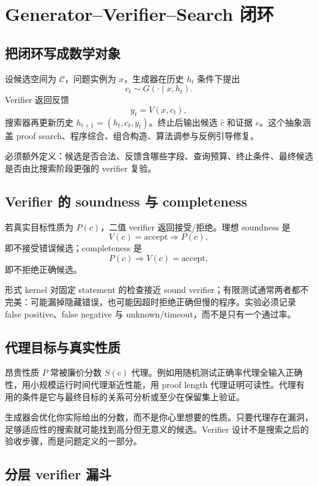 \chapter{Generator--Verifier--Search 闭环}

\section{把闭环写成数学对象}

设候选空间为 $\mathcal C$，问题实例为 $x$，生成器在历史 $h_t$ 条件下提出
\[
c_t\sim G(\cdot\mid x,h_t).
\]
Verifier 返回反馈
\[
y_t=V(x,c_t),
\]
搜索器再更新历史 $h_{t+1}=(h_t,c_t,y_t)$。终止后输出候选 $\hat c$ 和证据 $e$。这个抽象涵盖 proof search、程序综合、组合构造、算法调参与反例引导修复。

必须额外定义：候选是否合法、反馈含哪些字段、查询预算、终止条件、最终候选是否由比搜索阶段更强的 verifier 复验。

\section{Verifier 的 soundness 与 completeness}

若真实目标性质为 $P(c)$，二值 verifier 返回接受/拒绝。理想 soundness 是
\[
V(c)=\mathrm{accept}\Rightarrow P(c),
\]
即不接受错误候选；completeness 是
\[
P(c)\Rightarrow V(c)=\mathrm{accept},
\]
即不拒绝正确候选。

形式 kernel 对固定 statement 的检查接近 sound verifier；有限测试通常两者都不完美：可能漏掉隐藏错误，也可能因超时拒绝正确但慢的程序。实验必须记录 false positive、false negative 与 unknown/timeout，而不是只有一个通过率。

\section{代理目标与真实性质}

昂贵性质 $P$ 常被廉价分数 $S(c)$ 代理。例如用随机测试正确率代理全输入正确性，用小规模运行时间代理渐近性能，用 proof length 代理证明可读性。代理有用的条件是它与最终目标的关系可分析或至少在保留集上验证。

\begin{warningbox}
生成器会优化你实际给出的分数，而不是你心里想要的性质。只要代理存在漏洞，足够适应性的搜索就可能找到高分但无意义的候选。Verifier 设计不是搜索之后的验收步骤，而是问题定义的一部分。
\end{warningbox}

\section{分层 verifier 漏斗}

